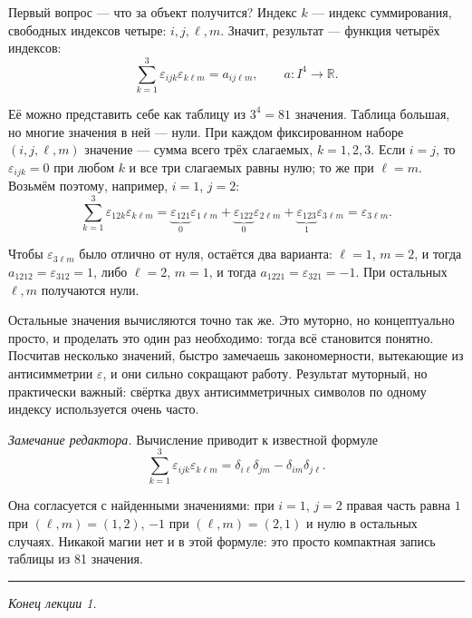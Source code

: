 \documentclass[11pt,a4paper]{article}
\begin{document}
Первый вопрос — что за объект получится? Индекс $k$ — индекс суммирования, свободных индексов четыре: $i, j, \ell, m$. Значит, результат — функция четырёх индексов:
\[
\sum_{k=1}^{3} \varepsilon_{ijk} \varepsilon_{k\ell m} = a_{ij\ell m}, \qquad a\colon I^4 \to \mathbb{R}.
\]

Её можно представить себе как таблицу из $3^4 = 81$ значения. Таблица большая, но многие значения в ней — нули. При каждом фиксированном наборе $(i, j, \ell, m)$ значение — сумма всего трёх слагаемых, $k = 1, 2, 3$. Если $i = j$, то $\varepsilon_{ijk} = 0$ при любом $k$ и все три слагаемых равны нулю; то же при $\ell = m$. Возьмём поэтому, например, $i = 1$, $j = 2$:
\[
\sum_{k=1}^{3} \varepsilon_{12k} \varepsilon_{k\ell m}
= \underbrace{\varepsilon_{121}}_{0} \varepsilon_{1\ell m}
+ \underbrace{\varepsilon_{122}}_{0} \varepsilon_{2\ell m}
+ \underbrace{\varepsilon_{123}}_{1} \varepsilon_{3\ell m}
= \varepsilon_{3\ell m}.
\]

Чтобы $\varepsilon_{3\ell m}$ было отлично от нуля, остаётся два варианта: $\ell = 1$, $m = 2$, и тогда $a_{1212} = \varepsilon_{312} = 1$, либо $\ell = 2$, $m = 1$, и тогда $a_{1221} = \varepsilon_{321} = -1$. При остальных $\ell, m$ получаются нули.

Остальные значения вычисляются точно так же. Это муторно, но концептуально просто, и проделать это один раз необходимо: тогда всё становится понятно. Посчитав несколько значений, быстро замечаешь закономерности, вытекающие из антисимметрии $\varepsilon$, и они сильно сокращают работу. Результат муторный, но практически важный: свёртка двух антисимметричных символов по одному индексу используется очень часто.

\emph{Замечание редактора.} Вычисление приводит к известной формуле
\[
\sum_{k=1}^{3} \varepsilon_{ijk} \varepsilon_{k\ell m} = \delta_{i\ell} \delta_{jm} - \delta_{im} \delta_{j\ell}.
\]

Она согласуется с найденными значениями: при $i = 1$, $j = 2$ правая часть равна $1$ при $(\ell, m) = (1, 2)$, $-1$ при $(\ell, m) = (2, 1)$ и нулю в остальных случаях. Никакой магии нет и в этой формуле: это просто компактная запись таблицы из 81 значения.


\par\bigskip\noindent\rule{\textwidth}{0.4pt}\par\noindent \emph{Конец лекции 1.}
\end{document}
